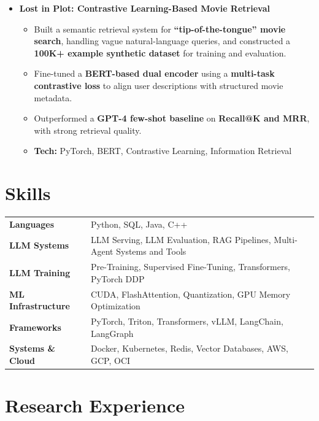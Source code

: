 \documentclass[a4paper,11pt]{article}
\begin{document}
\begin{itemize}
\item \textbf{Lost in Plot: Contrastive Learning-Based Movie Retrieval}
\begin{itemize}[nosep, after=\strut, leftmargin=1.2em, itemsep=2pt]
    \item Built a semantic retrieval system for \textbf{“tip-of-the-tongue” movie search}, handling vague natural-language queries, and constructed a \textbf{100K+ example synthetic dataset} for training and evaluation.
    \item Fine-tuned a \textbf{BERT-based dual encoder} using a \textbf{multi-task contrastive loss} to align user descriptions with structured movie metadata.
    \item Outperformed a \textbf{GPT-4 few-shot baseline} on \textbf{Recall@K and MRR}, with strong retrieval quality.
    \item \textbf{Tech:} PyTorch, BERT, Contrastive Learning, Information Retrieval
\end{itemize}

\end{itemize}

\color{BlueViolet}
\section{Skills}
\color{black}

\begin{tabularx}{\linewidth}{@{}l X@{}}
  \textbf{Languages} & Python, SQL, Java, C++ \\
  \textbf{LLM Systems} & LLM Serving, LLM Evaluation, RAG Pipelines, Multi-Agent Systems and Tools \\
  \textbf{LLM Training} & Pre-Training, Supervised Fine-Tuning, Transformers, PyTorch DDP \\
  \textbf{ML Infrastructure} & CUDA, FlashAttention, Quantization, GPU Memory Optimization \\
  \textbf{Frameworks} & PyTorch, Triton, Transformers, vLLM, LangChain, LangGraph \\
  \textbf{Systems \& Cloud} & Docker, Kubernetes, Redis, Vector Databases, AWS, GCP, OCI

\end{tabularx}

\color{BlueViolet}
\section{Research Experience}
\color{black}
\end{document}
